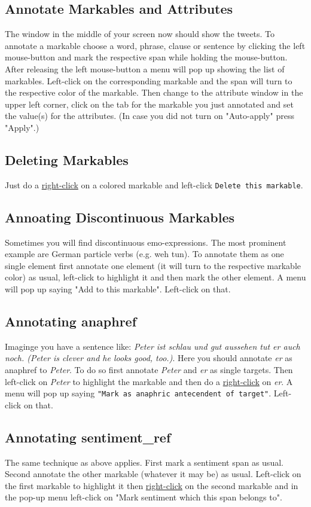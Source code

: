 \documentclass[11pt,a4paper]{article}
\begin{document}
\subsection{Annotate Markables and Attributes}
The window in the middle of your screen now should show the tweets. To annotate a markable choose a word, phrase, clause or sentence by clicking the left mouse-button and mark the respective span while holding the mouse-button. After releasing the left mouse-button a menu will pop up showing the list of markables. Left-click on the corresponding markable and the span will turn to the respective color of the markable. Then change to the attribute window in the upper left corner, click on the tab for the markable you just annotated and set the value(s) for the attributes. (In case you did not turn on "Auto-apply" press "Apply".)

\subsection{Deleting Markables}
Just do a \underline{right-click} on a colored markable and left-click \texttt{Delete this markable}.

\subsection{Annoating Discontinuous Markables}
Sometimes you will find discontinuous emo-expressions. The most prominent example are German particle verbs (e.g. weh tun). To annotate them as one single element first annotate one element (it will turn to the respective markable color) as usual, left-click to highlight it and then mark the other element. A menu will pop up saying "Add to this markable". Left-click on that.

\subsection{Annotating anaphref}
Imaginge you have a sentence like: \textit{Peter ist schlau und gut aussehen tut er auch noch. (Peter is clever and he looks good, too.)}. Here you should annotate \textit{er} as anaphref to \textit{Peter}. To do so first annotate \textit{Peter} and \textit{er} as single targets. Then left-click on \textit{Peter} to highlight the markable and then do a \underline{right-click} on \textit{er}. A menu will pop up saying \texttt{"Mark as anaphric antecendent of target"}. Left-click on that.

\subsection{Annotating sentiment\_ref}
The same technique as above applies. First mark a sentiment span as usual. Second annotate the other markable (whatever it may be) as usual. Left-click on the first markable to highlight it then \underline{right-click} on the second markable and in the pop-up menu left-click on "Mark sentiment which this span belongs to".
\end{document}
